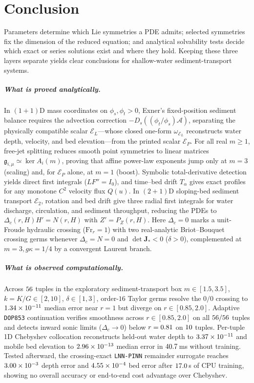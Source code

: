 \documentclass[12pt,a4paper,oneside]{report}
\numberwithin{equation}{chapter}
\theoremstyle{definition}
\theoremstyle{remark}\newtheorem{remark}[theorem]{Remark}
\DeclareRobustCommand{\code}[1]{\nolinkurl{#1}}
\begin{document}
\chapter{Conclusion}\label{ch:conclusion}

Parameters determine which Lie symmetries a PDE admits; selected symmetries fix the dimension of the reduced equation; and analytical solvability tests decide which exact or series solutions exist and where they hold. Keeping these three layers separate yields clear conclusions for shallow-water sediment-transport systems.

\paragraph{What is proved analytically.}
In $(1+1)$D mass coordinates on $\phi_s,\phi_t>0$, Exner's fixed-position sediment balance requires the advection correction $-D_s((\phi_t/\phi_s)\mathcal A)$, separating the physically compatible scalar $\mathcal E_L$---whose closed one-form $\omega_{\mathcal E_L}$ reconstructs water depth, velocity, and bed elevation---from the printed scalar $\mathcal E_P$. For all real $m\ge1$, free-jet splitting reduces smooth point symmetries to linear matrices $\mathfrak g_{i,\mu}\simeq\ker A_i(m)$, proving that affine power-law exponents jump only at $m=3$ (scaling) and, for $\mathcal E_P$ alone, at $m=1$ (boost). Symbolic total-derivative detection yields direct first integrals ($LF''=I_0$), and time--bed drift $T_\alpha$ gives exact profiles for any monotone $C^2$ velocity flux $Q(u)$. In $(2+1)$D sloping-bed sediment transport $\mathcal E_2$, rotation and bed drift give three radial first integrals for water discharge, circulation, and sediment throughput, reducing the PDEs to $\Delta_c(r,H)H'=N(r,H)$ with $Z'=P_Z(r,H)$. Here $\Delta_c=0$ marks a unit-Froude hydraulic crossing ($\mathrm{Fr}_r=1$) with two real-analytic Briot--Bouquet crossing germs whenever $\Delta_c=N=0$ and $\det\mathbf J_*<0$ ($\delta>0$), complemented at $m=3,g\kappa=1/4$ by a convergent Laurent branch.

\paragraph{What is observed computationally.}
Across $56$ tuples in the exploratory sediment-transport box $m\in[1.5,3.5]$, $k=K/G\in[2,10]$, $\delta\in[1,3]$, order-$16$ Taylor germs resolve the $0/0$ crossing to $1.34\times 10^{-11}$ median error near $r=1$ but diverge on $r\in[0.85,2.0]$. Adaptive \code{DOP853} continuation verifies smoothness across $r\in[0.85,2.0]$ on all $56/56$ tuples and detects inward sonic limits ($\Delta_c\to0$) below $r=0.81$ on $10$ tuples. Per-tuple 1D Chebyshev collocation reconstructs held-out water depth to $3.37\times 10^{-11}$ and mobile bed elevation to $2.96\times 10^{-13}$ median error in $40.7$\,ms without training. Tested afterward, the crossing-exact \texttt{LNN-PINN} remainder surrogate reaches $3.00\times 10^{-3}$ depth error and $4.55\times 10^{-4}$ bed error after $17.0$\,s of CPU training, showing no overall accuracy or end-to-end cost advantage over Chebyshev.
\end{document}
